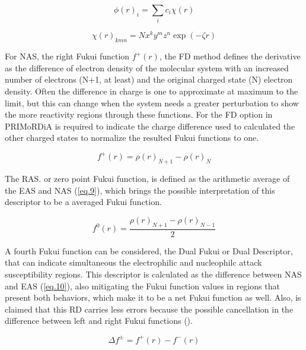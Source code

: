 \documentclass[a4paper,11pt]{refart}
\begin{document}
\begin{equation}
\phi(r)_i = \sum_{i} c_i \chi(r)
\label{eq.5} 
\end{equation}

\begin{equation}
\chi(r)_{kmn} = Nx^k y^m z^n \exp(- \zeta r)
\label{eq.6} 
\end{equation}

For NAS, the right Fukui function $f^{+}(r)$, the FD method defines the derivative as the difference of electron density of the molecular system with an increased number of electrons (N+1, at least) and the original charged state (N) electron density. Often the difference in charge is one to approximate at maximum to the limit, but this can change when the system needs a greater perturbation to show the more reactivity regions through these functions. For the FD option in PRIMoRDiA is required to indicate the charge difference used to calculated the other charged states to normalize the resulted Fukui functions to one.  

\begin{equation}
f^{+}(r) = \rho(r)_{N+1} -\rho(r)_{N}
\label{eq.8}
\end{equation}

The RAS. or zero point Fukui function, is defined as the arithmetic average of the EAS and NAS (\autoref{eq.9}), which brings the possible interpretation of this descriptor to be a averaged Fukui function. 

\begin{equation}
f^{0}(r) = \frac{\rho(r)_{N+1} -\rho (r)_{N-1}}{2}
\label{eq.9}
\end{equation}

A fourth Fukui function can be considered, the Dual Fukui or Dual Descriptor, that can indicate simultaneous the electrophilic and nucleophilc attack susceptibility regions. This descriptor is calculated as the difference between NAS and EAS (\autoref{eq.10}), also mitigating the Fukui function values in regions that present both behaviors, which make it to be a net Fukui function as well. Also, is claimed that this RD carries less errors because the possible cancellation in the difference between left and right Fukui functions  (\cite{martinez2015dual}). 

\begin{equation}
\Delta f^{\pm} = f^{+}(r) - f^{-}(r)
\label{eq.10}
\end{equation}
\end{document}
